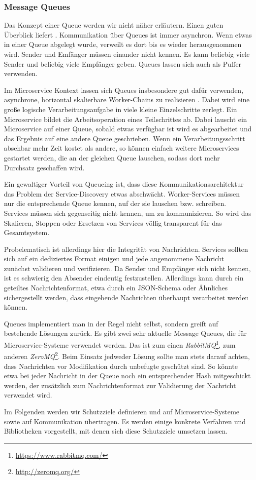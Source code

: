 \subsubsection{Message Queues}

Das Konzept einer Queue werden wir nicht näher erläutern. Einen guten Überblick liefert \cite{hohpe2003}. Kommunikation über Queues ist immer asynchron. Wenn etwas in einer Queue abgelegt wurde, verweilt es dort bis es wieder herausgenommen wird. Sender und Emfänger müssen einander nicht kennen. Es kann beliebig viele Sender und beliebig viele Empfänger geben. Queues lassen sich auch als Puffer verwenden. 

Im Microservice Kontext lassen sich Queues insbesondere gut dafür verwenden, asynchrone, horizontal skalierbare Worker-Chains zu realisieren \cite{newman2015}. Dabei wird eine große logische Verarbeitungsaufgabe in viele kleine Einzelschritte zerlegt. Ein Microservice bildet die Arbeitsoperation eines Teilschrittes ab. Dabei lauscht ein Microservice auf einer Queue, sobald etwas verfügbar ist wird es abgearbeitet und das Ergebnis auf eine andere Queue geschrieben. Wenn ein Verarbeitungsschritt absehbar mehr Zeit kostet als andere, so können einfach weitere Microservices gestartet werden, die an der gleichen Queue lauschen, sodass dort mehr Durchsatz geschaffen wird. 

Ein gewaltiger Vorteil von Queueing ist, dass diese Kommunikationsarchitektur das Problem der Service-Discovery etwas abschwächt. Worker-Services müssen nur die entsprechende Queue kennen, auf der sie lauschen bzw. schreiben. Services müssen sich gegenseitig nicht kennen, um zu kommunizieren. So wird das Skalieren, Stoppen oder Ersetzen von Services völlig transparent für das Gesamtsystem.

Probelematisch ist allerdings hier die Integrität von Nachrichten. Services sollten sich auf ein dediziertes Format einigen und jede angenommene Nachricht zunächst validieren und verifizieren. Da Sender und Empfänger sich nicht kennen, ist es schwierig den Absender eindeutig festzustellen. Allerdings kann durch ein geteiltes Nachrichtenformat, etwa durch ein JSON-Schema oder Ähnliches sichergestellt werden, dass eingehende Nachrichten überhaupt verarbeitet werden können.

Queues implementiert man in der Regel nicht selbst, sondern greift auf bestehende Lösungen zurück. Es gibt zwei sehr aktuelle Message Queues, die für Microservice-Systeme verwendet werden. Das ist zum einen \textit{RabbitMQ}\footnote{\url{https://www.rabbitmq.com/}}, zum anderen \textit{ZeroMQ}\footnote{\url{http://zeromq.org/}}. Beim Einsatz jedweder Lösung sollte man stets darauf achten, dass Nachrichten vor Modifikation durch unbefugte geschützt sind. So könnte etwa bei jeder Nachricht in der Queue noch ein entsprechender Hash mitgeschickt werden, der zusätzlich zum Nachrichtenformat zur Validierung der Nachricht verwendet wird.

Im Folgenden werden wir Schutzziele definieren und auf Microservice-Systeme sowie auf Kommunikation übertragen. Es werden einige konkrete Verfahren und Bibliotheken vorgestellt, mit denen sich diese Schutzziele umsetzen lassen. 
